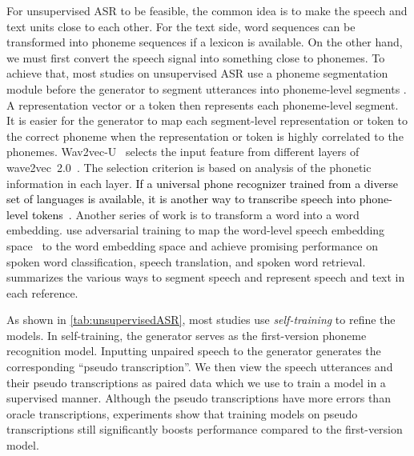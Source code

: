 For unsupervised ASR to be feasible, the common idea is to make the speech and text units close to each other.
For the text side, word sequences can be transformed into phoneme sequences if a lexicon is available. 
On the other hand, we must first convert the speech signal into something close to phonemes. 
To achieve that, most studies on unsupervised ASR use a phoneme
segmentation module before the generator to segment utterances into
phoneme-level segments \parencite{liu_completely_2018,chen_completely_2019,yeh_unsupervised_2019}. 
A representation vector or a token then represents each phoneme-level segment. 
It is easier for the generator to map each segment-level representation 
or token to the correct phoneme when the representation or token is highly correlated to the phonemes.
Wav2vec-U~\parencite{baevski_unsupervised_2021} selects the input feature from different layers of wave2vec~2.0~\parencite{baevski_wav2vec_2020}.
The selection criterion is based on analysis of the phonetic information in each layer.
\textcolor{black}{
If a universal phone recognizer trained from a diverse set of languages is available, it is another way to transcribe speech into phone-level tokens~\parencite{klejch_deciphering_2022}.}
Another series of work is to transform a word into a word embedding. 
\parencite{chung_unsupervised_2018,chung_unsupervised_2019a} use adversarial training to map the word-level
speech embedding space~\parencite{chung_speech2vec_2018} to the word embedding space
and achieve promising performance on spoken word classification, speech
translation, and spoken word retrieval.
 summarizes the various ways to segment speech and represent speech and text in each reference.  


As shown in \cref{tab:unsupervisedASR}, most studies use
\textit{self-training} to refine the models.
In self-training, the generator serves as the first-version phoneme recognition model.
Inputting unpaired speech to the generator generates the corresponding
``pseudo transcription''. 
We then view the speech utterances and their pseudo transcriptions as paired
data which we use to train a model in a supervised manner.
Although the pseudo transcriptions have more errors than oracle
transcriptions, experiments show that training models on pseudo
transcriptions still significantly boosts performance compared to the
first-version model.

